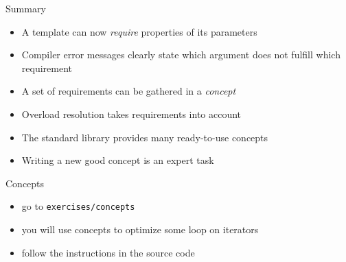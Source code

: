 \begin{frame}
    \begin{block}{Summary}
      \begin{itemize}
      \item A template can now \emph{require} properties of its parameters
      \item Compiler error messages clearly state which argument does not fulfill which requirement
      \item A set of requirements can be gathered in a \emph{concept}
      \item Overload resolution takes requirements into account
      \item The standard library provides many ready-to-use concepts
      \item Writing a new good concept is an expert task
      \end{itemize}
    \end{block}
\end{frame}

\begin{frame}
  \begin{exercise}{Concepts}
    \begin{itemize}
    \item go to \texttt{exercises/concepts}
    \item you will use concepts to optimize some loop on iterators
    \item follow the instructions in the source code
    \end{itemize}
  \end{exercise}
\end{frame}
